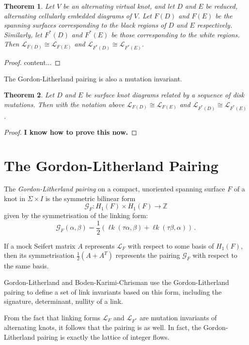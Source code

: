 \documentclass[12pt]{report}
\newcommand{\Z}{\mathbb{Z}}
\newcommand{\lk}{\operatorname{\ell\textit{k}}}
\newcommand{\notered}[1]{{\color{Red} \textbf{#1}}}
\newtheorem*{theorem}{Theorem}
\begin{document}
\begin{theorem}
Let $V$ be an alternating virtual knot, and let $D$ and $E$ be reduced, alternating cellularly embedded diagrams of $V$. Let $F(D)$ and $F(E)$ be the spanning surfaces corresponding to the black regions of $D$ and $E$ respectively. Similarly, let $F^{*}(D)$ and $F^{*}(E)$ be those corresponding to the white regions. Then $\mathcal{L}_{F(D)} \cong \mathcal{L}_{F(E)}$ and $\mathcal{L}_{F^{*}(D)} \cong \mathcal{L}_{F^{*}(E)}$.
\end{theorem}

\begin{proof}
	content...
\end{proof}

The Gordon-Litherland pairing is also a mutation invariant.

\begin{theorem}
Let $D$ and $E$ be surface knot diagrams related by a sequence of disk mutations. Then with the notation above $\mathcal{L}_{F(D)} \cong \mathcal{L}_{F(E)}$ and $\mathcal{L}_{F^{*}(D)} \cong \mathcal{L}_{F^{*}(E)}$.
\end{theorem}

\begin{proof}
\notered{I know how to prove this now.}
\end{proof}

\section{The Gordon-Litherland Pairing}

The \textit{Gordon-Litherland pairing} on a compact, unoriented spanning surface $F$ of a knot in $\Sigma \times I$ is the symmetric bilinear form
\[\mathcal{G}_{F}: H_{1}(F) \times H_{1}(F) \longrightarrow \Z\]
given by the symmetrisation of the linking form:
\[\mathcal{G}_{F}(\alpha, \beta) = \dfrac{1}{2}(\lk(\tau \alpha, \beta) + \lk(\tau\beta, \alpha))\,.\]

If a mock Seifert matrix $A$ represents $\mathcal{L}_{F}$ with respect to some basis of $H_{1}(F)$, then its symmetrisation $\frac{1}{2}(A + A^{T})$ represents the pairing $\mathcal{G}_{F}$ with respect to the same basis.

Gordon-Litherland and Boden-Karimi-Chrisman use the Gordon-Litherland pairing to define a set of link invariants based on this form, including the signature, determinant, nullity of a link.

From the fact that linking forms $\mathcal{L}_{F}$ and $\mathcal{L}_{F^{*}}$ are mutation invariants of alternating knots, it follows that the pairing is as well. In fact, the Gordon-Litherland pairing is exactly the lattice of integer flows.
\end{document}
